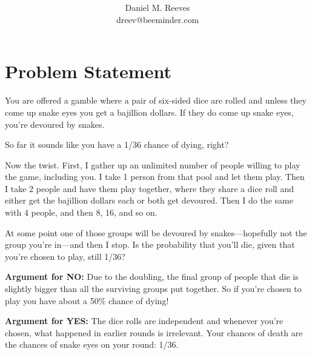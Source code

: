 \documentclass[article,twocolumn]{memoir}
\title{\HUGE\textbf{\longtitle}}
\author{Daniel M. Reeves\\dreev@beeminder.com}
\date{\protect\tstamp} %
\begin{document}
\pagestyle{headings}
\maketitle




\chapter*{Problem Statement}

You are offered a gamble where a pair of six-sided dice are rolled and unless they come up snake eyes you get a bajillion dollars. 
If they do come up snake eyes, you're devoured by snakes.

So far it sounds like you have a 1/36 chance of dying, right?

Now the twist. 
First, I gather up an unlimited number of people willing to play the game, including you. 
I take 1 person from that pool and let them play. 
Then I take 2 people and have them play together, where they share a dice roll and either get the bajillion dollars each or both get devoured. 
Then I do the same with 4 people, and then 8, 16, and so on.

At some point one of those groups will be devoured by snakes---hopefully not the group you're in---and then I stop.
Is the probability that you'll die, given that you're chosen to play, still 1/36?

\vspace{1em}

\textbf{Argument for NO:}
Due to the doubling, the final group of people that die is slightly bigger than all the surviving groups put together. 
So if you're chosen to play you have about a 50\% chance of dying!

\vspace{1em}

\textbf{Argument for YES:}
The dice rolls are independent and whenever you're chosen, what happened in earlier rounds is irrelevant.
Your chances of death are the chances of snake eyes on your round: 1/36.
\end{document}
